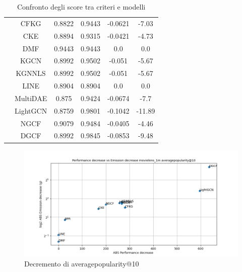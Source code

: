 \begin{table}[H]
{\begin{tabular}{|c|c|c|c|c|c|}
                                            & CFKG & 0.8822 & 0.9443 & -0.0621 & -7.03 \\ \cline{2-6}
                                            & CKE & 0.8894 & 0.9315 & -0.0421 & -4.73 \\ \cline{2-6}
                                            & DMF & 0.9443 & 0.9443 & 0.0 & 0.0 \\ \cline{2-6}
                                            & KGCN & 0.8992 & 0.9502 & -0.051 & -5.67 \\ \cline{2-6}
                                            & KGNNLS & 0.8992 & 0.9502 & -0.051 & -5.67 \\ \cline{2-6}
                                            & LINE & 0.8904 & 0.8904 & 0.0 & 0.0 \\ \cline{2-6}
                                            & MultiDAE & 0.875 & 0.9424 & -0.0674 & -7.7 \\ \cline{2-6}
                                            & LightGCN & 0.8759 & 0.9801 & -0.1042 & -11.89 \\ \cline{2-6}
                                            & NGCF & 0.9079 & 0.9484 & -0.0405 & -4.46 \\     \cline{2-6}
                                            & DGCF & 0.8992 & 0.9845 & -0.0853 & -9.48 \\ \cline{2-6}
            \hline
        \end{tabular}
    }
    \caption{Confronto degli score tra criteri e modelli}
    \label{tab:confronto-score}
\end{table}


\begin{figure}[H]
    \centering
     \includegraphics[width=\textwidth]{images/decrement_averagepopularity@10_movielens_1m.png}
    \caption{Decremento di averagepopularity@10}
\end{figure}

